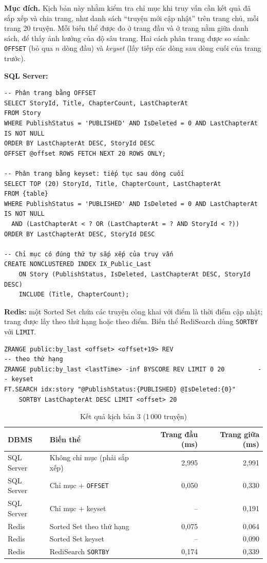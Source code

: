 \textbf{Mục đích.} Kịch bản này nhằm kiểm tra chỉ mục khi truy vấn cần kết quả đã sắp xếp và chia trang, như danh sách ``truyện mới cập nhật'' trên trang chủ, mỗi trang 20 truyện. Mỗi biến thể được đo ở trang đầu và ở trang nằm giữa danh sách, để thấy ảnh hưởng của độ sâu trang. Hai cách phân trang được so sánh: \texttt{OFFSET} (bỏ qua $n$ dòng đầu) và \emph{keyset} (lấy tiếp các dòng sau dòng cuối của trang trước).

\textbf{SQL Server:}

\begin{verbatim}
-- Phân trang bằng OFFSET
SELECT StoryId, Title, ChapterCount, LastChapterAt
FROM Story
WHERE PublishStatus = 'PUBLISHED' AND IsDeleted = 0 AND LastChapterAt IS NOT NULL
ORDER BY LastChapterAt DESC, StoryId DESC
OFFSET @offset ROWS FETCH NEXT 20 ROWS ONLY;

-- Phân trang bằng keyset: tiếp tục sau dòng cuối 
SELECT TOP (20) StoryId, Title, ChapterCount, LastChapterAt
FROM {table}
WHERE PublishStatus = 'PUBLISHED' AND IsDeleted = 0 AND LastChapterAt IS NOT NULL
  AND (LastChapterAt < ? OR (LastChapterAt = ? AND StoryId < ?))
ORDER BY LastChapterAt DESC, StoryId DESC

-- Chỉ mục có đúng thứ tự sắp xếp của truy vấn
CREATE NONCLUSTERED INDEX IX_Public_Last
    ON Story (PublishStatus, IsDeleted, LastChapterAt DESC, StoryId DESC)
    INCLUDE (Title, ChapterCount);
\end{verbatim}

\textbf{Redis:} một Sorted Set chứa các truyện công khai với điểm là thời điểm cập nhật; trang được lấy theo thứ hạng hoặc theo điểm. Biến thể RediSearch dùng \texttt{SORTBY} với \texttt{LIMIT}.

\begin{verbatim}
ZRANGE public:by_last <offset> <offset+19> REV                        -- theo thứ hạng
ZRANGE public:by_last <lastTime> -inf BYSCORE REV LIMIT 0 20         -- keyset
FT.SEARCH idx:story "@PublishStatus:{PUBLISHED} @IsDeleted:{0}"
    SORTBY LastChapterAt DESC LIMIT <offset> 20
\end{verbatim}

\begin{table}[H]
\centering\small
\begin{tabular}{|l|l|r|r|}
\hline
\textbf{DBMS} & \textbf{Biến thể} & \textbf{Trang đầu (ms)} & \textbf{Trang giữa (ms)} \\ \hline
SQL Server & Không chỉ mục (phải sắp xếp) & 2,995 & 2,991 \\ \hline
SQL Server & Chỉ mục + \texttt{OFFSET} & 0,050 & 0,330 \\ \hline
SQL Server & Chỉ mục + keyset & -- & 0,191 \\ \hline
Redis & Sorted Set theo thứ hạng & 0,075 & 0,064 \\ \hline
Redis & Sorted Set keyset & -- & 0,090 \\ \hline
Redis & RediSearch \texttt{SORTBY} & 0,174 & 0,339 \\ \hline
\end{tabular}
\caption{Kết quả kịch bản 3 (1\,000 truyện)}
\label{tab:idx-i3}
\end{table}

